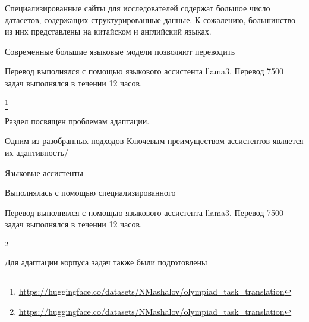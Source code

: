 

Специализированные сайты для исследователей содержат
большое число датасетов, содержащих структурированные данные. 
К сожалению, большинство из них представлены на китайском и английский языках. 

Современные большие языковые модели позволяют переводить 



Перевод выполнялся с помощью языкового ассистента llama3. Перевод 7500 задач выполнялся в течении 12 часов.

\footnote{\url{https://huggingface.co/datasets/NMashalov/olympiad_task_translation}}



Раздел посвящен проблемам адаптации.



Одним из разобранных подходов Ключевым преимуществом ассистентов является их адаптивность/

Языковые ассистенты 

Выполнялась с помощью специализированного 

Перевод выполнялся с помощью языкового ассистента llama3. Перевод 7500 задач выполнялся в течении 12 часов.

\footnote{\url{https://huggingface.co/datasets/NMashalov/olympiad_task_translation}}



Для адаптации корпуса задач также были подготовлены



